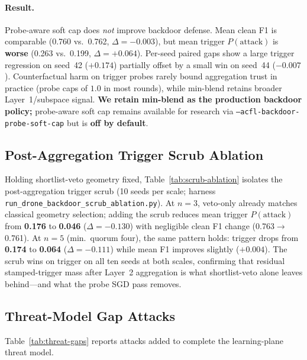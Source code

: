 \paragraph{Result.}
Probe-aware soft cap does \emph{not} improve backdoor defense.
Mean clean F1 is comparable (0.760 vs.\ 0.762, $\Delta = -0.003$), but mean trigger $P(\text{attack})$ is \textbf{worse} (0.263 vs.\ 0.199, $\Delta = +0.064$).
Per-seed paired gaps show a large trigger regression on seed~42 ($+0.174$) partially offset by a small win on seed~44 ($-0.007$).
Counterfactual harm on trigger probes rarely bound aggregation trust in practice (probe caps of $1.0$ in most rounds), while min-blend retains broader Layer~1/subspace signal.
\textbf{We retain min-blend as the production backdoor policy;} probe-aware soft cap remains available for research via \texttt{--acfl-backdoor-probe-soft-cap} but is \textbf{off by default}.

\subsection{Post-Aggregation Trigger Scrub Ablation}
\label{sec:exp-scrub-ablation}

Holding shortlist-veto geometry fixed, Table~\ref{tab:scrub-ablation} isolates the post-aggregation trigger scrub (10 seeds per scale; harness \texttt{run\_drone\_backdoor\_scrub\_ablation.py}).
At $n{=}3$, veto-only already matches classical geometry selection; adding the scrub reduces mean trigger $P(\text{attack})$ from \textbf{0.176} to \textbf{0.046} ($\Delta{=}-0.130$) with negligible clean F1 change (0.763$\to$0.761).
At $n{=}5$ (min.\ quorum four), the same pattern holds: trigger drops from \textbf{0.174} to \textbf{0.064} ($\Delta{=}-0.111$) while mean F1 improves slightly ($+0.004$).
The scrub wins on trigger on all ten seeds at both scales, confirming that residual stamped-trigger mass after Layer~2 aggregation is what shortlist-veto alone leaves behind---and what the probe SGD pass removes.

\subsection{Threat-Model Gap Attacks}
\label{sec:exp-threat-gaps}

Table~\ref{tab:threat-gaps} reports attacks added to complete the learning-plane threat model.

